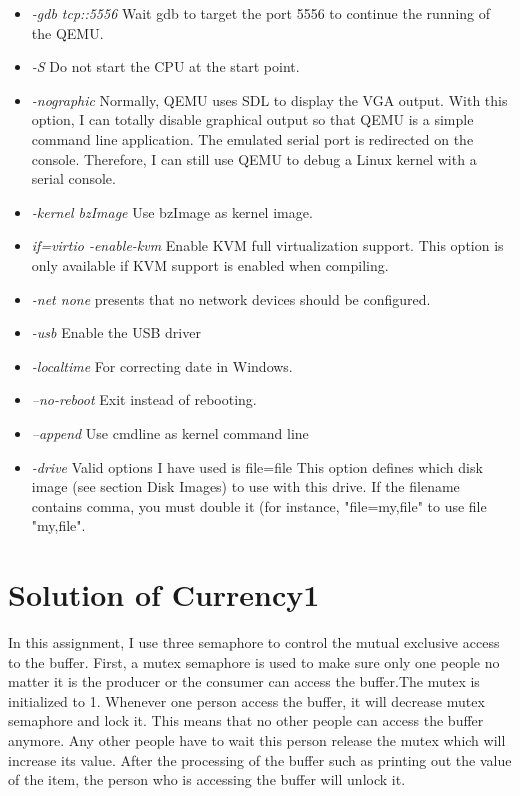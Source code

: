 \documentclass[10pt,draftclsnofoot,peerreview,letterpaper,onecolumn,]{IEEEtran}
\begin{document}
\begin{itemize}
\item \emph{-gdb tcp::5556} Wait gdb to target the port 5556 to continue the running of the QEMU.
\item \emph{-S} Do not start the CPU at the start point.
\item \emph{-nographic} Normally, QEMU uses SDL to display the VGA output. With this option, I can totally disable graphical output so that QEMU is a simple command line application. The emulated serial port is redirected on the console. Therefore, I can still use QEMU to debug a Linux kernel with a serial console.
\item \emph{-kernel bzImage} Use bzImage as kernel image.
\item \emph{if=virtio -enable-kvm} Enable KVM full virtualization support. This option is only available if KVM support is enabled when compiling.
\item \emph{-net none} presents that no network devices should be configured. 
\item \emph{-usb}  Enable the USB driver 
\item \emph{-localtime}  For correcting date in Windows.
\item \emph{--no-reboot} Exit instead of rebooting.
\item \emph{--append} Use cmdline as kernel command line
\item \emph{-drive} Valid options I have used is \:
file=file
This option defines which disk image (see section Disk Images) to use with this drive. If the filename contains comma, you must double it (for instance, "file=my,file" to use file "my,file".
\end{itemize}

\section{Solution of Currency1}

In this assignment, I use three semaphore to control the mutual exclusive access to the buffer. First, a mutex semaphore is used to make sure only one people no matter it is the producer or the consumer can access the buffer.The mutex is initialized to 1.  Whenever one person access the buffer, it will decrease mutex semaphore and lock it. This means that no other people can access the buffer anymore. Any other people have to wait this person release the mutex which will increase its value. After the processing of the buffer such as printing out the value of the item, the person who is accessing the buffer will unlock it.
\end{document}

